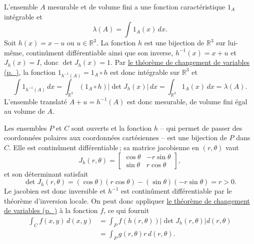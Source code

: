 \label{II-answer-vr}
L'ensemble \(A\) mesurable et de volume fini a une fonction
caractéristique \(1_A\) intégrable et \[
\lambda(A) = \int 1_A(x) \, dx.
\] Soit \(h(x) = x - u\) ou \(u \in \mathbb{R}^3\). La fonction \(h\)
est une bijection de \(\mathbb{R}^3\) sur lui-même, continûment
différentiable ainsi que son inverse, \(h^{-1}(x) = x + u\) et
\(J_h(x) = I\), donc \(\det J_h(x) = 1\). Par
\protect\hyperref[II-theorem-changement-de-variables]{le théorème de
changement de
variables (p.~\pageref*{II-theorem-changement-de-variables})}, la
fonction \(1_{h^{-1}(A)} = 1_{A} \circ h\) est donc intégrable sur
\(\mathbb{R}^3\) et \[
\int 1_{h^{-1}(A)}\, dx = \int_{\mathbb{R}^3} (1_A \circ h) |\det J_h(x)| \, dx = \int_{\mathbb{R}^3} 1_A(x) \, dx = \lambda(A).
\] L'ensemble translaté \(A + u = h^{-1}(A)\) est donc mesurable, de
volume fini égal au volume de \(A\).

\label{II-answer-cp}
Les ensembles \(P\) et \(C\) sont ouverts et la fonction \(h\) -- qui
permet de passer des coordonnées polaires aux coordonnées cartésiennes
-- est une bijection de \(P\) dans \(C\). Elle est continûment
différentiable\,; sa matrice jacobienne en \((r, \theta)\) vaut \[
J_{h}(r, \theta) = 
\left[ 
\begin{array}{cr}
\cos \theta & -r \sin \theta \\
\sin \theta & r \cos \theta
\end{array}
\right],
\] et son déterminant satisfait \[
\det J_{h}(r, \theta) = (\cos \theta)(r \cos \theta) - (\sin \theta)(-r\sin \theta)
= r > 0.
\] Le jacobien est donc inversible et \(h^{-1}\) est continûment
différentiable par le théorème d'inversion locale. On peut donc
appliquer \protect\hyperref[II-theorem-changement-de-variables]{le
théorème de changement de
variables (p.~\pageref*{II-theorem-changement-de-variables})} à la
fonction \(f\), ce qui fournit \begin{align*}
\int_C f(x, y) \, d(x, y) &= \int_P f(h(r, \theta)) |\det J_h(r,\theta)| d(r,\theta) \\
&= \int_P g(r, \theta)  r \, d(r,\theta).
\end{align*}


